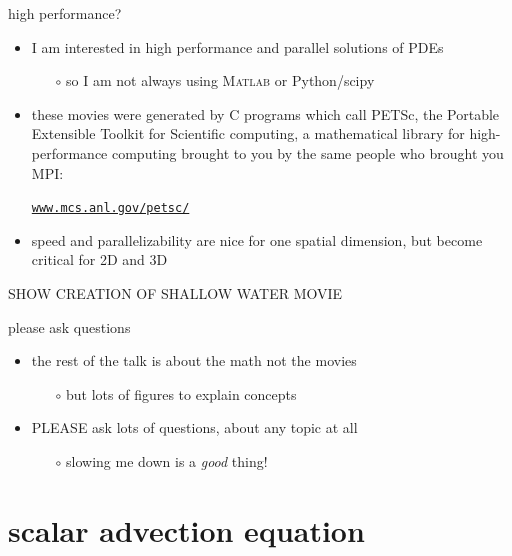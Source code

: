 \documentclass[10pt,hyperref]{beamer}
\newcommand{\Matlab}{\textsc{Matlab}\xspace}
\begin{document}
\begin{frame}{high performance?}

\begin{itemize}
\item I am interested in high performance and parallel solutions of PDEs
    \begin{itemize}
    \item[$\circ$] so I am not always using \Matlab or Python/scipy
    \end{itemize}
\item these movies were generated by C programs which call PETSc, the Portable Extensible Toolkit for Scientific computing, a mathematical library for high-performance computing brought to you by the same people who brought you MPI:

    \begin{center}
    \href{https://www.mcs.anl.gov/petsc/}{\texttt{www.mcs.anl.gov/petsc/}}
    \end{center}
\item speed and parallelizability are nice for one spatial dimension, but become critical for 2D and 3D
\end{itemize}

\vspace{10mm}
\begin{center}
\alert{SHOW CREATION OF SHALLOW WATER MOVIE}
\end{center}

\end{frame}


\begin{frame}{please ask questions}

\begin{itemize}
\item the rest of the talk is about the math not the movies
    \begin{itemize}
    \item[$\circ$] but lots of figures to explain concepts
    \end{itemize}
\item \alert{PLEASE} ask lots of questions, about any topic at all
    \begin{itemize}
    \item[$\circ$] slowing me down is a \emph{good} thing!
    \end{itemize}
\end{itemize}
\end{frame}


\section{scalar advection equation}
\end{document}
